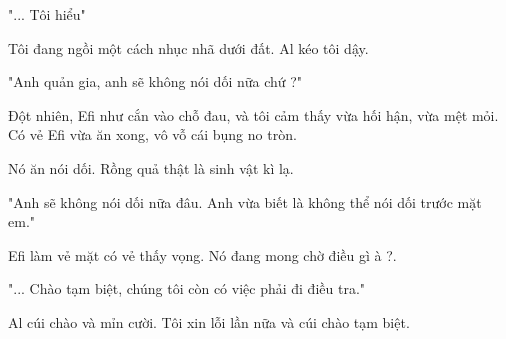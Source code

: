 "... Tôi hiểu"

Tôi đang ngồi một cách nhục nhã dưới đất. Al kéo tôi dậy.

"Anh quản gia, anh sẽ không nói dối nữa chứ ?"

Đột nhiên, Efi như cắn vào chỗ đau, và tôi cảm thấy vừa hối hận, vừa mệt mỏi. Có vẻ Efi vừa ăn xong, vô vỗ cái bụng no tròn.

Nó ăn nói dối. Rồng quả thật là sinh vật kì lạ.

"Anh sẽ không nói dối nữa đâu. Anh vừa biết là không thể nói dối trước mặt em."

Efi làm vẻ mặt có vẻ thấy vọng. Nó đang mong chờ điều gì à ?.

"... Chào tạm biệt, chúng tôi còn có việc phải đi điều tra."

Al cúi chào và mỉn cười. Tôi xin lỗi lần nữa và cúi chào tạm biệt.


